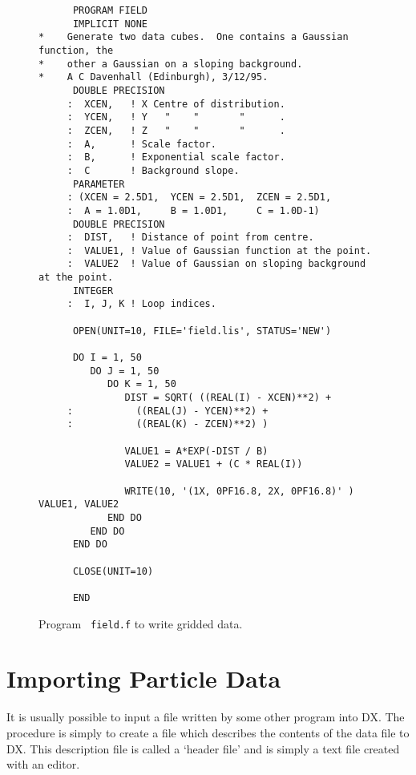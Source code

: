 \begin{figure}[htbp]

\begin{verbatim}
      PROGRAM FIELD
      IMPLICIT NONE
*    Generate two data cubes.  One contains a Gaussian function, the
*    other a Gaussian on a sloping background.
*    A C Davenhall (Edinburgh), 3/12/95.
      DOUBLE PRECISION
     :  XCEN,   ! X Centre of distribution.
     :  YCEN,   ! Y   "    "       "      .
     :  ZCEN,   ! Z   "    "       "      .
     :  A,      ! Scale factor.
     :  B,      ! Exponential scale factor.
     :  C       ! Background slope.
      PARAMETER
     : (XCEN = 2.5D1,  YCEN = 2.5D1,  ZCEN = 2.5D1,
     :  A = 1.0D1,     B = 1.0D1,     C = 1.0D-1)
      DOUBLE PRECISION
     :  DIST,   ! Distance of point from centre.
     :  VALUE1, ! Value of Gaussian function at the point.
     :  VALUE2  ! Value of Gaussian on sloping background at the point.
      INTEGER
     :  I, J, K ! Loop indices.

      OPEN(UNIT=10, FILE='field.lis', STATUS='NEW')

      DO I = 1, 50
         DO J = 1, 50
            DO K = 1, 50
               DIST = SQRT( ((REAL(I) - XCEN)**2) +
     :           ((REAL(J) - YCEN)**2) +
     :           ((REAL(K) - ZCEN)**2) )

               VALUE1 = A*EXP(-DIST / B)
               VALUE2 = VALUE1 + (C * REAL(I))

               WRITE(10, '(1X, 0PF16.8, 2X, 0PF16.8)' ) VALUE1, VALUE2
            END DO
         END DO
      END DO

      CLOSE(UNIT=10)

      END
\end{verbatim}

\caption[Program {\tt field.f} to write gridded data.]{Program {\tt 
field.f} to write gridded data. \label{FIELD.F} }

\end{figure}


\newpage
\section{\label{IMP_PART}Importing Particle Data}


It is usually possible to input a file written by some other program
into DX. The procedure is simply to create a file which describes the
contents of the data file to DX. This description file is called a
`header file' and is simply a text file created with an editor.

